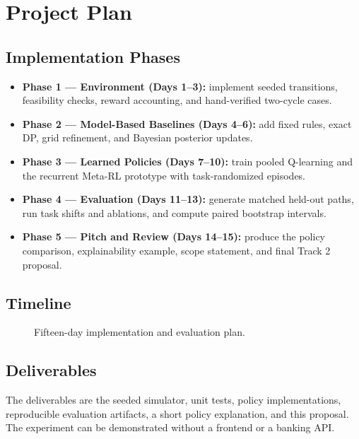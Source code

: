 \section{Project Plan}\label{sec:project_plan}

\subsection{Implementation Phases}
\begin{itemize}[noitemsep,topsep=2pt]
    \item \textbf{Phase 1 --- Environment (Days 1--3):} implement seeded transitions, feasibility checks, reward accounting, and hand-verified two-cycle cases.
    \item \textbf{Phase 2 --- Model-Based Baselines (Days 4--6):} add fixed rules, exact DP, grid refinement, and Bayesian posterior updates.
    \item \textbf{Phase 3 --- Learned Policies (Days 7--10):} train pooled Q-learning and the recurrent Meta-RL prototype with task-randomized episodes.
    \item \textbf{Phase 4 --- Evaluation (Days 11--13):} generate matched held-out paths, run task shifts and ablations, and compute paired bootstrap intervals.
    \item \textbf{Phase 5 --- Pitch and Review (Days 14--15):} produce the policy comparison, explainability example, scope statement, and final Track 2 proposal.
\end{itemize}

\subsection{Timeline}
\begin{figure}[htbp]
\centerline{}
\caption{Fifteen-day implementation and evaluation plan.}
\label{fig:gantt}
\end{figure}

\subsection{Deliverables}
The deliverables are the seeded simulator, unit tests, policy implementations, reproducible evaluation artifacts, a short policy explanation, and this proposal. The experiment can be demonstrated without a frontend or a banking API.
